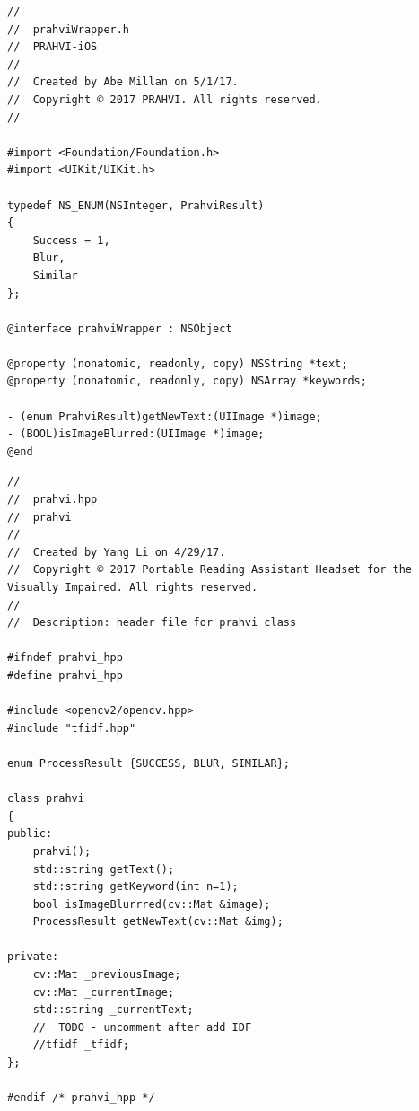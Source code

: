 \begin{lstlisting}
//
//  prahviWrapper.h
//  PRAHVI-iOS
//
//  Created by Abe Millan on 5/1/17.
//  Copyright © 2017 PRAHVI. All rights reserved.
//

#import <Foundation/Foundation.h>
#import <UIKit/UIKit.h>

typedef NS_ENUM(NSInteger, PrahviResult)
{
    Success = 1,
    Blur,
    Similar
};

@interface prahviWrapper : NSObject

@property (nonatomic, readonly, copy) NSString *text;
@property (nonatomic, readonly, copy) NSArray *keywords;

- (enum PrahviResult)getNewText:(UIImage *)image;
- (BOOL)isImageBlurred:(UIImage *)image;
@end
\end{lstlisting}

\begin{lstlisting}
//
//  prahvi.hpp
//  prahvi
//
//  Created by Yang Li on 4/29/17.
//  Copyright © 2017 Portable Reading Assistant Headset for the Visually Impaired. All rights reserved.
//
//  Description: header file for prahvi class

#ifndef prahvi_hpp
#define prahvi_hpp

#include <opencv2/opencv.hpp>
#include "tfidf.hpp"

enum ProcessResult {SUCCESS, BLUR, SIMILAR};

class prahvi
{
public:
	prahvi();
	std::string getText();
	std::string getKeyword(int n=1);
    bool isImageBlurrred(cv::Mat &image);
	ProcessResult getNewText(cv::Mat &img);
    
private:
	cv::Mat _previousImage;
	cv::Mat _currentImage;
	std::string _currentText;
	//	TODO - uncomment after add IDF
	//tfidf _tfidf;
};

#endif /* prahvi_hpp */
\end{lstlisting}

